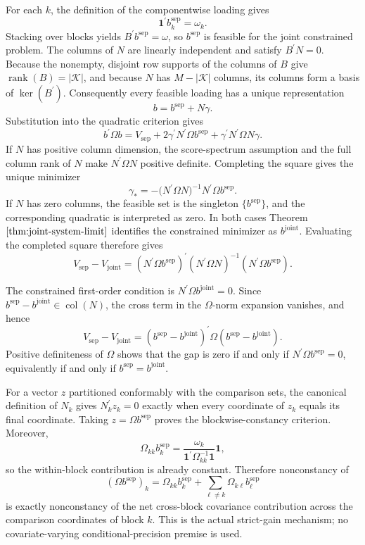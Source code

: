 For each \(k\), the definition of the componentwise loading gives
\[
\mathbf 1^{\prime}b_k^{\mathrm{sep}}=\omega_k.
\]
Stacking over blocks yields \(B^{\prime}b^{\mathrm{sep}}=\omega\), so \(b^{\mathrm{sep}}\) is feasible for the joint constrained problem. The columns of \(N\) are linearly independent and satisfy \(B^{\prime}N=0\). Because the nonempty, disjoint row supports of the columns of \(B\) give \(\operatorname{rank}(B)=|\mathcal K|\), and because \(N\) has \(M-|\mathcal K|\) columns, its columns form a basis of \(\ker(B^{\prime})\). Consequently every feasible loading has a unique representation
\[
b=b^{\mathrm{sep}}+N\gamma.
\]
Substitution into the quadratic criterion gives
\[
b^{\prime}\Omega b
=V_{\mathrm{sep}}
+2\gamma^{\prime}N^{\prime}\Omega b^{\mathrm{sep}}
+\gamma^{\prime}N^{\prime}\Omega N\gamma.
\]
If \(N\) has positive column dimension, the score-spectrum assumption and the full column rank of \(N\) make \(N^{\prime}\Omega N\) positive definite. Completing the square gives the unique minimizer
\[
\gamma_*=-\bigl(N^{\prime}\Omega N\bigr)^{-1}N^{\prime}\Omega b^{\mathrm{sep}}.
\]
If \(N\) has zero columns, the feasible set is the singleton \(\{b^{\mathrm{sep}}\}\), and the corresponding quadratic is interpreted as zero. In both cases Theorem \(\ref{thm:joint-system-limit}\) identifies the constrained minimizer as \(b^{\mathrm{joint}}\). Evaluating the completed square therefore gives
\[
V_{\mathrm{sep}}-V_{\mathrm{joint}}
=(N^{\prime}\Omega b^{\mathrm{sep}})^{\prime}
 (N^{\prime}\Omega N)^{-1}
 (N^{\prime}\Omega b^{\mathrm{sep}}).
\]

The constrained first-order condition is \(N^{\prime}\Omega b^{\mathrm{joint}}=0\). Since \(b^{\mathrm{sep}}-b^{\mathrm{joint}}\in\operatorname{col}(N)\), the cross term in the \(\Omega\)-norm expansion vanishes, and hence
\[
V_{\mathrm{sep}}-V_{\mathrm{joint}}
=(b^{\mathrm{sep}}-b^{\mathrm{joint}})^{\prime}
 \Omega(b^{\mathrm{sep}}-b^{\mathrm{joint}}).
\]
Positive definiteness of \(\Omega\) shows that the gap is zero if and only if \(N^{\prime}\Omega b^{\mathrm{sep}}=0\), equivalently if and only if \(b^{\mathrm{sep}}=b^{\mathrm{joint}}\).

For a vector \(z\) partitioned conformably with the comparison sets, the canonical definition of \(N_k\) gives \(N_k^{\prime}z_k=0\) exactly when every coordinate of \(z_k\) equals its final coordinate. Taking \(z=\Omega b^{\mathrm{sep}}\) proves the blockwise-constancy criterion. Moreover,
\[
\Omega_{kk}b_k^{\mathrm{sep}}
=\frac{\omega_k}{\mathbf 1^{\prime}\Omega_{kk}^{-1}\mathbf 1}\mathbf 1,
\]
so the within-block contribution is already constant. Therefore nonconstancy of
\[
(\Omega b^{\mathrm{sep}})_k
=\Omega_{kk}b_k^{\mathrm{sep}}
+\sum_{\ell\ne k}\Omega_{k\ell}b_\ell^{\mathrm{sep}}
\]
is exactly nonconstancy of the net cross-block covariance contribution across the comparison coordinates of block \(k\). This is the actual strict-gain mechanism; no covariate-varying conditional-precision premise is used.

